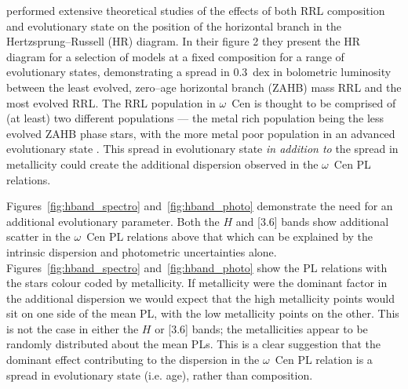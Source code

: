 \documentclass[a4paper,fleqn,usenatbib]{mnras}
\begin{document}
\citet{2015ApJ...808...50M} performed extensive theoretical studies of the effects of both RRL composition and evolutionary state on the position of the horizontal branch in the Hertzsprung--Russell (HR) diagram. In their figure 2 they present the HR diagram for a selection of models at a fixed composition for a range of evolutionary states, demonstrating a spread in 0.3~dex in bolometric luminosity between the least evolved, zero--age horizontal branch (ZAHB) mass RRL and the most evolved RRL. The RRL population in $\omega$~Cen is thought to be comprised of (at least) two different populations --- the metal rich population being the less evolved ZAHB phase stars, with the more metal poor population in an advanced evolutionary state \citep{2016MNRAS.457.4525T}. This spread in evolutionary state \textit{in addition to} the spread in metallicity could create the additional dispersion observed in the $\omega$~Cen PL relations. 

Figures~\ref{fig:hband_spectro} and~\ref{fig:hband_photo} demonstrate the need for an additional evolutionary parameter. Both the $H$ and [3.6] bands show additional scatter in the $\omega$~Cen PL relations above that which can be explained by the intrinsic dispersion and photometric uncertainties alone. Figures~\ref{fig:hband_spectro} and~\ref{fig:hband_photo} show the PL relations with the stars colour coded by metallicity. If metallicity were the dominant factor in the additional dispersion we would expect that the high metallicity points would sit on one side of the mean PL, with the low metallicity points on the other. This is not the case in either the $H$ or [3.6] bands; the metallicities appear to be randomly distributed about the mean PLs. This is a clear suggestion that the dominant effect contributing to the dispersion in the  $\omega$~Cen PL relation is a spread in evolutionary state (i.e. age), rather than composition. 
\end{document}
